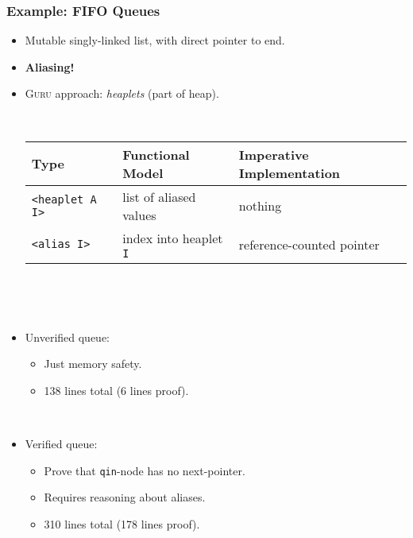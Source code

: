 \documentclass[10pt]{beamer}
\begin{document}
\begin{frame}
\frametitle{Example: FIFO Queues}

\begin{itemize}
\item Mutable singly-linked list, with direct pointer to end.
\item \textbf{Aliasing!}
\item \textsc{Guru} approach: \emph{heaplets} (part of heap).

\ 

{\small
\begin{tabular}{|l|l|l|}
\hline
Type & Functional Model & Imperative Implementation \\
\hline
\texttt{<heaplet A I>} & list of aliased values & nothing\\
\texttt{<alias I>} & index into heaplet \texttt{I} & reference-counted pointer\\
\hline
\end{tabular}}

\ 

\ 

\item Unverified queue:
\begin{itemize}
\item Just memory safety.
\item 138 lines total (6 lines proof).
\end{itemize}

\ 

\item Verified queue:
\begin{itemize}
\item Prove that \texttt{qin}-node has no next-pointer.
\item Requires reasoning about aliases.
\item 310 lines total (178 lines proof).
\end{itemize}

\end{itemize}
\end{frame}
\end{document}
